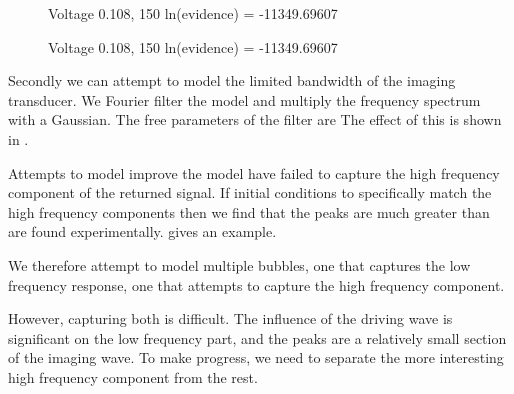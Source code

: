 \begin{figure}[t]%
  \centering
  \subfloat[1st pulse - 1000]{
    \label{fig:plot_bubble_fit_108_150_filter_a:first}
    }
\caption{Voltage 0.108, 150 ln(evidence) = -11349.69607 }
\end{figure}

\begin{figure}[t]%
  \centering
  \subfloat[1st pulse - 1000]{
    \label{fig:plot_bubble_fit_108_150_filter_a:first}
    }
\caption{Voltage 0.108, 150 ln(evidence) = -11349.69607 }
\end{figure}


Secondly we can attempt to  model the limited bandwidth of the imaging transducer.
We Fourier filter the model and multiply the frequency spectrum with a Gaussian.
The free parameters of the filter are
The effect of this is shown in \figref{}.

%
Attempts to model improve the model have failed to capture the high frequency component of the returned signal.
If initial conditions to specifically match the high frequency components then
we find that the peaks are much greater than are found experimentally.
\Figref{} gives an example.

We therefore attempt to model multiple bubbles,
one that captures the low frequency response,
one that attempts to capture the high frequency component.

However, capturing both is difficult. 
The influence of the driving wave is significant on the low frequency part,
and the peaks are a relatively small section of the imaging wave.
To make progress, we need  to separate the more interesting high frequency component 
from the rest.




